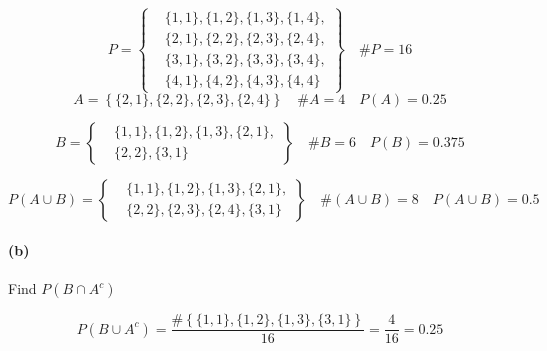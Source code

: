     \begin{mdframed}
        \begin{equation*}
            P = \left\{
                \begin{aligned}
                    &\{1,1\}, \{1,2\}, \{1,3\}, \{1,4\}, \\
                    &\{2,1\}, \{2,2\}, \{2,3\}, \{2,4\}, \\
                    &\{3,1\}, \{3,2\}, \{3,3\}, \{3,4\}, \\ 
                    &\{4,1\}, \{4,2\}, \{4,3\}, \{4,4\}
                \end{aligned}
                \right\} \quad \# P = 16
        \end{equation*}
        \begin{equation*}
            A = \left\{\{2,1\}, \{2,2\}, \{2,3\}, \{2,4\}\right\} \quad \#A = 4 \quad P(A) = 0.25
        \end{equation*}

        \begin{equation*}
            B = \left\{
                \begin{aligned}
                    &\{1,1\}, \{1,2\}, \{1,3\}, \{2,1\},    \\
                    &\{2,2\}, \{3,1\}
                \end{aligned}
            \right\} \quad \#B = 6 \quad P(B) = 0.375
        \end{equation*}

        \begin{equation*}
            P(A \cup B) = \left\{
                \begin{aligned}
                    &\{1,1\}, \{1,2\}, \{1,3\}, \{2,1\},    \\
                    &\{2,2\}, \{2,3\}, \{2,4\}, \{3,1\}
                \end{aligned}
            \right\} \quad \#(A \cup B) = 8 \quad \boxed{P(A \cup B) = 0.5}
        \end{equation*}
    \end{mdframed}

    \paragraph*{(b)}
    Find $P(B \cap A^c)$

    \begin{mdframed}
        \begin{equation*}
            P(B \cup A^c) = \frac{\#\left\{\{1,1\}, \{1,2\}, \{1,3\}, \{3,1\}\right\}}{16} = \frac{4}{16} = \boxed{0.25}
        \end{equation*}
    \end{mdframed}

